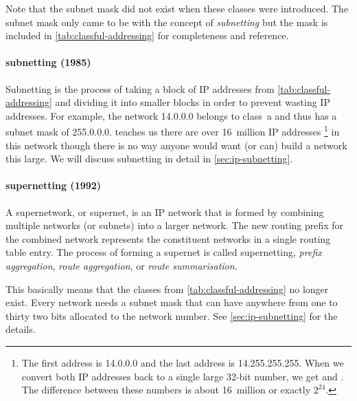 Note that the subnet mask did not exist when these classes were introduced.
The subnet mask only came to be with the concept of \emph{subnetting} but the mask is included in \cref{tab:classful-addressing} for completeness and reference.

\paragraph{subnetting (1985)}
Subnetting is the process of taking a block of \acs{IP} addresses from \vref{tab:classful-addressing} and dividing it into smaller blocks in order to prevent wasting \acs{IP} addresses.
For example, the network 14.0.0.0 belongs to class~a and thus has a subnet mask of 255.0.0.0.
 teaches us there are over 16~million \acs{IP} addresses%
   \footnote{%
      The first address is 14.0.0.0 and the last address is 14.255.255.255.
      When we convert both \acs{IP} addresses back to a single large 32-bit number, we get  and .
      The difference between these numbers is about 16~million or exactly $2^24$.
   }
in this network though there is no way anyone would want (or can) build a network this large.
We will discuss subnetting in detail in \vref{sec:ip-subnetting}.

\paragraph{supernetting (1992)}
A supernetwork, or supernet, is an \acs{IP} network that is formed by combining multiple networks (or subnets) into a larger network.
The new routing prefix for the combined network represents the constituent networks in a single routing table entry.
The process of forming a supernet is called supernetting, \emph{prefix aggregation}, \emph{route aggregation}, or \emph{route summarisation}.

This basically means that the classes from \vref{tab:classful-addressing} no longer exist.
Every network needs a subnet mask that can have anywhere from one to thirty two bits allocated to the network number.
See \vref{sec:ip-subnetting} for the details.

